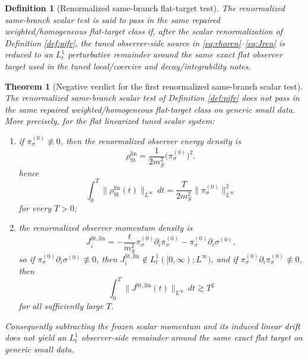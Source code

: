 \documentclass[11pt]{article}
\newtheorem{definition}{Definition}
\newtheorem{theorem}{Theorem}
\begin{document}
\begin{definition}[Renormalized same-branch flat-target test]
\label{def:flatarget}
The renormalized same-branch scalar test is said to \emph{pass in the same repaired weighted/homogeneous flat-target class} if, after the scalar renormalization of Definition \ref{def:pifr}, the tuned observer-side source in \eqref{eq:rhoren}--\eqref{eq:Jren} is reduced to an \(L_t^1\) perturbative remainder around the same exact flat observer target used in the tuned local/coercive and decay/integrability notes.
\end{definition}

\begin{theorem}[Negative verdict for the first renormalized same-branch scalar test]
\label{thm:negative}
The renormalized same-branch scalar test of Definition \ref{def:pifr} does \emph{not} pass in the same repaired weighted/homogeneous flat-target class on generic small data. More precisely, for the flat linearized tuned scalar system:
\begin{enumerate}
    \item if \(\pi_\sigma^{(0)}\not\equiv 0\), then the renormalized observer energy density is
    \begin{equation}
    \rho_{\mathrm{St}}^{\mathrm{lin}}
    =
    \frac{1}{2m_S^2}\bigl(\pi_\sigma^{(0)}\bigr)^2,
    \label{eq:rholin}
    \end{equation}
    hence
    \begin{equation}
    \int_0^T \|\rho_{\mathrm{St}}^{\mathrm{lin}}(t)\|_{L^\infty}\,dt
    =
    \frac{T}{2m_S^2}\|\pi_\sigma^{(0)}\|_{L^\infty}^2
    \label{eq:rholinint}
    \end{equation}
    for every \(T>0\);
    \item the renormalized observer momentum density is
    \begin{equation}
    J_i^{\mathrm{St,lin}}
    =
    -\frac{t}{m_S^2}\pi_\sigma^{(0)}\partial_i\pi_\sigma^{(0)}
    -\pi_\sigma^{(0)}\partial_i\sigma^{(0)},
    \label{eq:Jlin}
    \end{equation}
    so if \(\pi_\sigma^{(0)}\partial_i\sigma^{(0)}\not\equiv 0\), then \(J_i^{\mathrm{St,lin}}\notin L_t^1([0,\infty);L^\infty)\), and if \(\pi_\sigma^{(0)}\partial_i\pi_\sigma^{(0)}\not\equiv 0\), then
    \begin{equation}
    \int_0^T \|J^{\mathrm{St,lin}}(t)\|_{L^\infty}\,dt
    \gtrsim
    T^2
    \label{eq:Jlinint}
    \end{equation}
    for all sufficiently large \(T\).
\end{enumerate}
Consequently subtracting the frozen scalar momentum and its induced linear drift does not yield an \(L_t^1\) observer-side remainder around the same exact flat target on generic small data.
\end{theorem}
\end{document}
